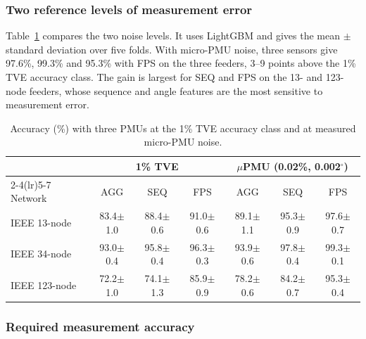 \documentclass[11pt]{article}
\newenvironment{nw}{}{}
\newenvironment{nwf}{}{}
\begin{document}
\begin{nw}
\subsubsection{Two reference levels of measurement error}\label{subsec5_noise}
Table~\ref{tab5} compares the two noise levels. It uses LightGBM and gives the mean $\pm$ standard deviation over five folds. With micro-PMU noise, three sensors give 97.6\%, 99.3\% and 95.3\% with FPS on the three feeders, 3--9 points above the 1\% TVE accuracy class. The gain is largest for SEQ and FPS on the 13- and 123-node feeders, whose sequence and angle features are the most sensitive to measurement error.

\end{nw}
\begin{table}[!htbp]
\centering
\begin{nwf}
\caption{Accuracy (\%) with three PMUs at the 1\% TVE accuracy class and at measured micro-PMU noise.}\label{tab5}
\footnotesize
\begin{tabular}{lcccccc}
\toprule
 & \multicolumn{3}{c}{1\% TVE} & \multicolumn{3}{c}{$\mu$PMU (0.02\%, 0.002$^\circ$)} \\
\cmidrule(lr){2-4}\cmidrule(lr){5-7}
Network & AGG & SEQ & FPS & AGG & SEQ & FPS \\
\midrule
IEEE 13-node  & 83.4$\pm$1.0 & 88.4$\pm$0.6 & 91.0$\pm$0.6 & 89.1$\pm$1.1 & 95.3$\pm$0.9 & 97.6$\pm$0.7 \\
IEEE 34-node  & 93.0$\pm$0.4 & 95.8$\pm$0.4 & 96.3$\pm$0.3 & 93.9$\pm$0.6 & 97.8$\pm$0.4 & 99.3$\pm$0.1 \\
IEEE 123-node & 72.2$\pm$1.0 & 74.1$\pm$1.3 & 85.9$\pm$0.9 & 78.2$\pm$0.6 & 84.2$\pm$0.7 & 95.3$\pm$0.4 \\
\bottomrule
\end{tabular}
\end{nwf}
\end{table}

\subsubsection{Required measurement accuracy}\label{subsec5_spec}
\end{document}
